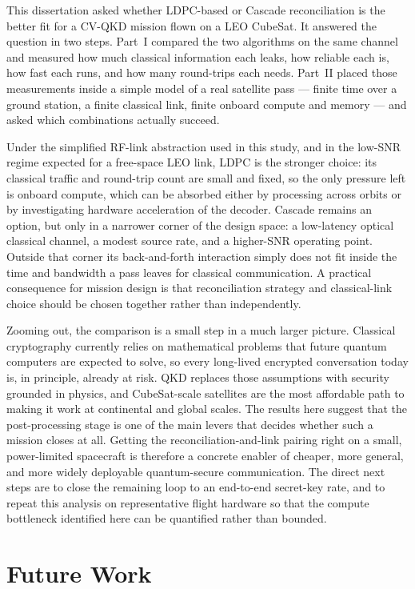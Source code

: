 \documentclass{UoYCSproject}
\begin{document}
This dissertation asked whether LDPC-based or Cascade reconciliation
is the better fit for a CV-QKD mission flown on a LEO CubeSat. It
answered the question in two steps. Part~I compared the two algorithms
on the same channel and measured how much classical information each
leaks, how reliable each is, how fast each runs, and how many round-trips
each needs. Part~II placed those measurements inside a simple model of
a real satellite pass --- finite time over a ground station, a finite
classical link, finite onboard compute and memory --- and asked which
combinations actually succeed.

Under the simplified RF-link abstraction used in this study, and in the
low-SNR regime expected for a free-space LEO link, LDPC is the stronger
choice: its classical traffic and round-trip
count are small and fixed, so the only pressure left is onboard
compute, which can be absorbed either by processing across orbits or
by investigating hardware acceleration of the decoder. Cascade remains
an option, but only in a narrower corner of the design space: a
low-latency optical classical channel, a modest source rate, and a
higher-SNR operating point. Outside that corner its back-and-forth
interaction simply does not fit inside the time and bandwidth a pass
leaves for classical communication. A practical consequence for
mission design is that reconciliation strategy and classical-link
choice should be chosen together rather than independently.

Zooming out, the comparison is a small step in a much larger picture.
Classical cryptography currently relies on mathematical problems that
future quantum computers are expected to solve, so every long-lived
encrypted conversation today is, in principle, already at risk. QKD
replaces those assumptions with security grounded in physics, and
CubeSat-scale satellites are the most affordable path to making it work
at continental and global scales. The results here suggest that the
post-processing stage is one of the main levers that decides whether such
a mission closes at all. Getting the reconciliation-and-link pairing
right on a small, power-limited spacecraft is therefore a concrete
enabler of cheaper, more general, and more widely deployable
quantum-secure communication. The direct next steps are to close the
remaining loop to an end-to-end secret-key rate, and to repeat this
analysis on representative flight hardware so that the compute
bottleneck identified here can be quantified rather than bounded.

\section{Future Work}
\label{sec:future-work}
\end{document}
